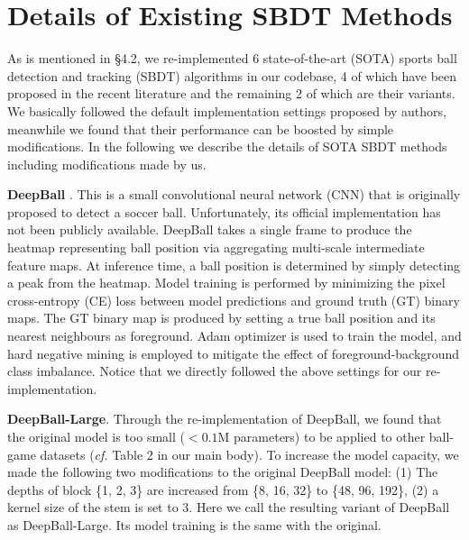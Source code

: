 \documentclass{bmvc2k}
\begin{document}
\section{Details of Existing SBDT Methods}
\label{appendix:imple}
As is mentioned in \S 4.2, we re-implemented 6 state-of-the-art (SOTA) sports ball detection and tracking (SBDT) algorithms in our codebase, 4 of which have been proposed in the recent literature \cite{komorowski+2019mva,komorowski+2020visapp,zandycke+2019mmsports,sun+2020icpai,liu+2022cvprw} and the remaining 2 of which are their variants.
We basically followed the default implementation settings proposed by authors, meanwhile we found that their performance can be boosted by simple modifications.
In the following we describe the details of SOTA SBDT methods including modifications made by us.
\par
\vspace{1mm}
\noindent \textbf{DeepBall} \cite{komorowski+2019mva,komorowski+2020visapp}. This is a small convolutional neural network (CNN) that is originally proposed to detect a soccer ball.
Unfortunately, its official implementation has not been publicly available.
DeepBall takes a single frame to produce the heatmap representing ball position via aggregating multi-scale intermediate feature maps.
At inference time, a ball position is determined by simply detecting a peak from the heatmap.
Model training is performed by minimizing the pixel cross-entropy (CE) loss between model predictions and ground truth (GT) binary maps.
The GT binary map is produced by setting a true ball position and its nearest neighbours as foreground.
Adam optimizer \cite{kingma+2015iclr} is used to train the model, and hard negative mining \cite{liu+2016eccv} is employed to mitigate the effect of foreground-background class imbalance.
Notice that we directly followed the above settings for our re-implementation.
\par
\vspace{1mm}
\noindent \textbf{DeepBall-Large}.
Through the re-implementation of DeepBall, we found that the original model is too small ($< 0.1$M parameters) to be applied to other ball-game datasets ({\it cf.} Table 2 in our main body).
To increase the model capacity, we made the following two modifications to the original DeepBall model: (1) The depths of block \{1, 2, 3\} are increased from \{8, 16, 32\} to \{48, 96, 192\}, (2) a kernel size of the stem is set to 3.
Here we call the resulting variant of DeepBall as DeepBall-Large.
Its model training is the same with the original.
\par
\end{document}
